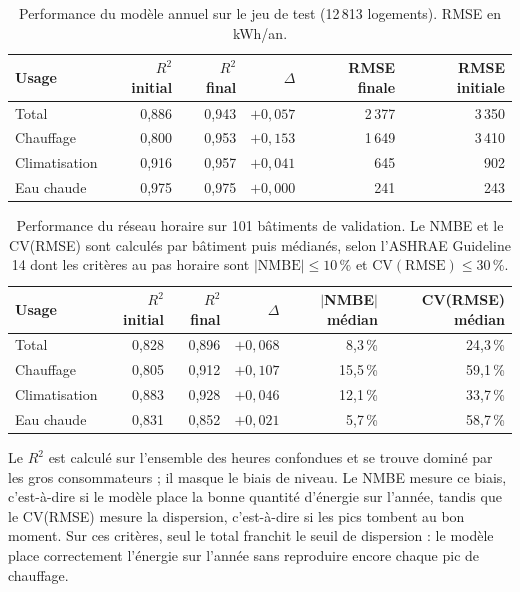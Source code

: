 \documentclass[11pt,a4paper]{article}
\begin{document}
\begin{table}[htbp]
  \centering
  \caption{Performance du modèle annuel sur le jeu de test (12\,813 logements).
  RMSE en kWh/an.}
  \label{tab:lgbm}
  \begin{tabular}{lrrrrr}
    \toprule
    Usage & $R^2$ initial & $R^2$ final & $\Delta$ & RMSE finale & RMSE initiale \\
    \midrule
    Total         & 0,886 & 0,943 & $+0{,}057$ & 2\,377 & 3\,350 \\
    Chauffage     & 0,800 & 0,953 & $+0{,}153$ & 1\,649 & 3\,410 \\
    Climatisation & 0,916 & 0,957 & $+0{,}041$ & 645    & 902    \\
    Eau chaude    & 0,975 & 0,975 & $+0{,}000$ & 241    & 243    \\
    \bottomrule
  \end{tabular}
\end{table}

\begin{table}[htbp]
  \centering
  \caption{Performance du réseau horaire sur 101 bâtiments de validation. Le NMBE et le
  CV(RMSE) sont calculés par bâtiment puis médianés, selon l'ASHRAE Guideline 14 dont les
  critères au pas horaire sont $|\mathrm{NMBE}| \leq 10\,\%$ et
  $\mathrm{CV(RMSE)} \leq 30\,\%$.}
  \label{tab:reseau}
  \begin{tabular}{lrrrrr}
    \toprule
    Usage & $R^2$ initial & $R^2$ final & $\Delta$ & $|$NMBE$|$ médian & CV(RMSE) médian \\
    \midrule
    Total         & 0,828 & 0,896 & $+0{,}068$ & 8,3\,\%  & 24,3\,\% \\
    Chauffage     & 0,805 & 0,912 & $+0{,}107$ & 15,5\,\% & 59,1\,\% \\
    Climatisation & 0,883 & 0,928 & $+0{,}046$ & 12,1\,\% & 33,7\,\% \\
    Eau chaude    & 0,831 & 0,852 & $+0{,}021$ & 5,7\,\%  & 58,7\,\% \\
    \bottomrule
  \end{tabular}
\end{table}

Le $R^2$ est calculé sur l'ensemble des heures confondues et se trouve dominé par les gros
consommateurs ; il masque le biais de niveau. Le NMBE mesure ce biais, c'est-à-dire si le
modèle place la bonne quantité d'énergie sur l'année, tandis que le CV(RMSE) mesure la
dispersion, c'est-à-dire si les pics tombent au bon moment. Sur ces critères, seul le total
franchit le seuil de dispersion : le modèle place correctement l'énergie sur l'année sans
reproduire encore chaque pic de chauffage.
\end{document}
